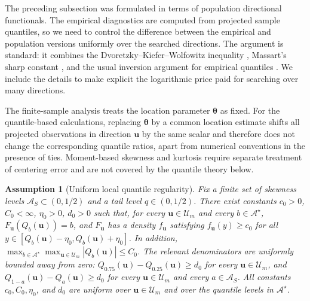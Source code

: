 \documentclass[11pt]{article}
\theoremstyle{plain}
\newtheorem{assumption}{Assumption}
\theoremstyle{definition}
\theoremstyle{remark}
\def\X{\bm{X}}
\def\u{\bm{u}}
\newcommand{\boldtheta}{\bm{\theta}}
\newcommand{\sd}[1]{{\color{red}(SD: #1)}}
\begin{document}
The preceding subsection was formulated in terms of population directional functionals. The empirical diagnostics are computed from projected sample quantiles, so we need to control the difference between the empirical and population versions uniformly over the searched directions. The argument is standard: it combines the Dvoretzky--Kiefer--Wolfowitz inequality \citep{dvoretzky1956asymptotic}, Massart's sharp constant \citep{massart1990tight}, and the usual inversion argument for empirical quantiles \citep[see, for example,][Chapter~21]{vandervaart1998asymptotic}. We include the details to make explicit the logarithmic price paid for searching over many directions.


The finite-sample analysis treats the location parameter $\boldtheta$ as fixed. For the quantile-based calculations, replacing $\boldtheta$ by a common location estimate shifts all projected observations in direction $\u$ by the same scalar and therefore does not change the corresponding quantile ratios, apart from numerical conventions in the presence of ties. Moment-based skewness and kurtosis require separate treatment of centering error and are not covered by the quantile theory below.

\begin{assumption}[Uniform local quantile regularity]
	\label{ass:uniform_quantile_regular}
	Fix a finite set of skewness levels \(\mathcal A_S\subset(0,1/2)\) and a tail level \(q\in(0,1/2)\). There exist constants \(c_0>0\), \(C_0<\infty\), \(\eta_0>0\), \(d_0>0\) such that, for every \(\u\in\mathcal U_m\) and every \(b\in\mathcal A^\star\), \(F_{\u}(Q_b(\u))=b\), and \(F_{\u}\) has a density \(f_{\u}\) satisfying \(f_{\u}(y)\geqslant c_0\) for all \(y\in[Q_b(\u)-\eta_0,Q_b(\u)+\eta_0]\). In addition, \(\max_{b\in\mathcal A^\star}\max_{\u\in\mathcal U_m}|Q_b(\u)|\leqslant C_0\). The relevant denominators are uniformly bounded away from zero: \(Q_{0.75}(\u)-Q_{0.25}(\u)\geqslant d_0\) for every \(\u\in\mathcal U_m\), and \(Q_{1-a}(\u)-Q_a(\u)\geqslant d_0\) for every \(\u\in\mathcal U_m\) and every \(a\in\mathcal A_S\). All constants \(c_0,C_0,\eta_0\), and \(d_0\) are uniform over \(\u\in\mathcal U_m\) and over the quantile levels in \(\mathcal A^\star\).
\end{assumption}
\end{document}
